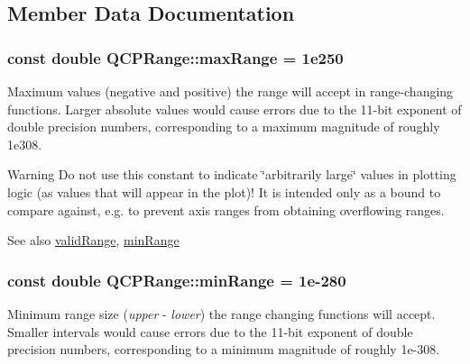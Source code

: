\subsection{Member Data Documentation}
\subsubsection[{\texorpdfstring{max\+Range}{maxRange}}]{\setlength{\rightskip}{0pt plus 5cm}const double Q\+C\+P\+Range\+::max\+Range = 1e250\hspace{0.3cm}{\ttfamily [static]}}\hypertarget{classQCPRange_a5ca51e7a2dc5dc0d49527ab171fe1f4f}{}\label{classQCPRange_a5ca51e7a2dc5dc0d49527ab171fe1f4f}
Maximum values (negative and positive) the range will accept in range-\/changing functions. Larger absolute values would cause errors due to the 11-\/bit exponent of double precision numbers, corresponding to a maximum magnitude of roughly 1e308.

\begin{DoxyWarning}{Warning}
Do not use this constant to indicate \char`\"{}arbitrarily large\char`\"{} values in plotting logic (as values that will appear in the plot)! It is intended only as a bound to compare against, e.\+g. to prevent axis ranges from obtaining overflowing ranges.
\end{DoxyWarning}
\begin{DoxySeeAlso}{See also}
\hyperlink{classQCPRange_ab38bd4841c77c7bb86c9eea0f142dcc0}{valid\+Range}, \hyperlink{classQCPRange_ab46d3bc95030ee25efda41b89e2b616b}{min\+Range} 
\end{DoxySeeAlso}
\subsubsection[{\texorpdfstring{min\+Range}{minRange}}]{\setlength{\rightskip}{0pt plus 5cm}const double Q\+C\+P\+Range\+::min\+Range = 1e-\/280\hspace{0.3cm}{\ttfamily [static]}}\hypertarget{classQCPRange_ab46d3bc95030ee25efda41b89e2b616b}{}\label{classQCPRange_ab46d3bc95030ee25efda41b89e2b616b}
Minimum range size ({\itshape upper} -\/ {\itshape lower}) the range changing functions will accept. Smaller intervals would cause errors due to the 11-\/bit exponent of double precision numbers, corresponding to a minimum magnitude of roughly 1e-\/308.

